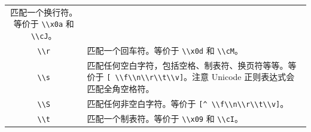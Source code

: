 \documentclass[doctor,openright,twoside]{sjtuthesis}
\newcommand{\passthrough}[1]{#1}
\theoremstyle{plain}
\theoremstyle{definition}
\theoremstyle{remark}
\theoremstyle{ocrenumbox}
\theoremstyle{plain}
\begin{document}
\begin{longtable}[]{@{}cl@{}}
\begin{minipage}[t]{0.72\columnwidth}
匹配一个换行符。等价于 \passthrough{\lstinline!\\x0a!} 和 \passthrough{\lstinline!\\cJ!}。\strut
\end{minipage}\tabularnewline
\begin{minipage}[t]{0.23\columnwidth}\centering
\passthrough{\lstinline!\\r!}\strut
\end{minipage} & \begin{minipage}[t]{0.72\columnwidth}\raggedright
匹配一个回车符。等价于 \passthrough{\lstinline!\\x0d!} 和 \passthrough{\lstinline!\\cM!}。\strut
\end{minipage}\tabularnewline
\begin{minipage}[t]{0.23\columnwidth}\centering
\passthrough{\lstinline!\\s!}\strut
\end{minipage} & \begin{minipage}[t]{0.72\columnwidth}\raggedright
匹配任何空白字符，包括空格、制表符、换页符等等。等价于 \passthrough{\lstinline![ \\f\\n\\r\\t\\v]!}。注意 Unicode 正则表达式会匹配全角空格符。\strut
\end{minipage}\tabularnewline
\begin{minipage}[t]{0.23\columnwidth}\centering
\passthrough{\lstinline!\\S!}\strut
\end{minipage} & \begin{minipage}[t]{0.72\columnwidth}\raggedright
匹配任何非空白字符。等价于 \passthrough{\lstinline![^ \\f\\n\\r\\t\\v]!}。\strut
\end{minipage}\tabularnewline
\begin{minipage}[t]{0.23\columnwidth}\centering
\passthrough{\lstinline!\\t!}\strut
\end{minipage} & \begin{minipage}[t]{0.72\columnwidth}\raggedright
匹配一个制表符。等价于 \passthrough{\lstinline!\\x09!} 和 \passthrough{\lstinline!\\cI!}。\strut

\end{minipage}
\end{longtable}
\end{document}
